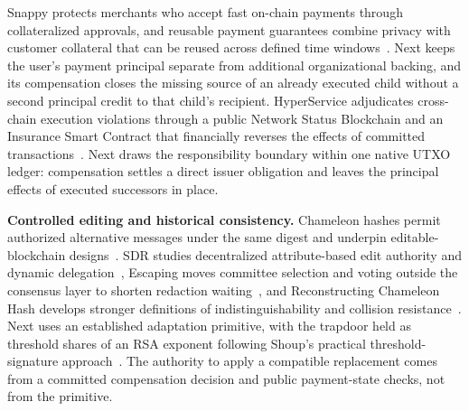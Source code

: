 Snappy protects merchants who accept fast on-chain payments through
collateralized approvals, and reusable payment guarantees combine privacy with
customer collateral that can be reused across defined time
windows~\cite{snappy,reusable}. Next keeps the user's payment principal
separate from additional organizational backing, and its compensation closes
the missing source of an already executed child without a second principal
credit to that child's recipient. HyperService adjudicates cross-chain
execution violations through a public Network Status Blockchain and an
Insurance Smart Contract that financially reverses the effects of committed
transactions~\cite{web3}. Next draws the responsibility boundary within one
native UTXO ledger: compensation settles a direct issuer obligation and leaves
the principal effects of executed successors in place.

\noindent\textbf{Controlled editing and historical consistency.}
Chameleon hashes permit authorized alternative messages under the same digest
and underpin editable-blockchain designs~\cite{redactable}. SDR studies
decentralized attribute-based edit authority and dynamic
delegation~\cite{sdr}, Escaping moves committee selection and voting outside
the consensus layer to shorten redaction waiting~\cite{escaping}, and
Reconstructing Chameleon Hash develops stronger definitions of
indistinguishability and collision resistance~\cite{reconstructCH}. Next uses
an established adaptation primitive, with the trapdoor held as threshold
shares of an RSA exponent following Shoup's practical threshold-signature
approach~\cite{shoup}. The authority to apply a compatible replacement comes
from a committed compensation decision and public payment-state checks, not
from the primitive.

